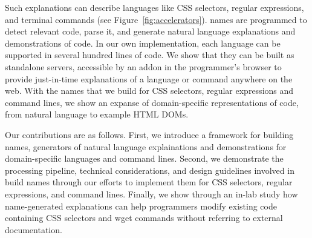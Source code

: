 Such explanations can describe languages like CSS selectors, regular expressions, and terminal commands (see Figure~\ref{fig:accelerators}).
\Glspl{name} are programmed to detect relevant code, parse it, and generate natural language explanations and demonstrations of code. 
In our own implementation, each language can be supported in several hundred lines of code.
We show that they can be built as standalone servers, accessible by an addon in the programmer's browser to provide just-in-time explanations of a language or command anywhere on the web.
With the \glspl{name} that we build for CSS selectors, regular expressions and command lines, we show an expanse of domain-specific representations of code, from natural language to example HTML DOMs.

Our contributions are as follows.
First, we introduce a framework for building \Glspl{name}, generators of natural language explainations and demonstrations for domain-specific languages and command lines.
Second, we demonstrate the processing pipeline, technical considerations, and design guidelines involved in build \glspl{name} through our efforts to implement them for CSS selectors, regular expressions, and command lines.
Finally, we show through an in-lab study how \gls{name}-generated explanations can help programmers modify existing code containing CSS selectors and wget commands without referring to external documentation.
